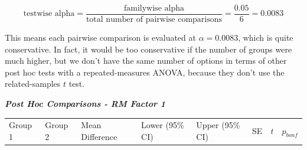 \documentclass[
  letterpaper,
  DIV=11,
  numbers=noendperiod]{scrreprt}
\begin{document}
\[
\text{testwise alpha} = \frac{\text{familywise alpha}}{\text{total number of pairwise comparisons}} = \frac{0.05}{6} = 0.0083
\]

This means each pairwise comparison is evaluated at \(\alpha = 0.0083\),
which is quite conservative. In fact, it would be too conservative if
the number of groups were much higher, but we don't have the same number
of options in terms of other post hoc tests with a repeated-measures
ANOVA, because they don't use the related-samples \(t\) test.

\textbf{\emph{Post Hoc Comparisons - RM Factor 1}}

\begin{longtable}[]{@{}
  >{\raggedright\arraybackslash}p{}
  >{\raggedright\arraybackslash}p{}
  >{\raggedright\arraybackslash}p{}
  >{\raggedright\arraybackslash}p{}
  >{\raggedright\arraybackslash}p{}
  >{\raggedright\arraybackslash}p{}
  >{\raggedright\arraybackslash}p{}
  >{\raggedright\arraybackslash}p{}@{}}
\toprule\noalign{}
\begin{minipage}[b]{\linewidth}\raggedright
Group 1
\end{minipage} & \begin{minipage}[b]{\linewidth}\raggedright
Group 2
\end{minipage} & \begin{minipage}[b]{\linewidth}\raggedright
Mean Difference
\end{minipage} & \begin{minipage}[b]{\linewidth}\raggedright
Lower (95\% CI)
\end{minipage} & \begin{minipage}[b]{\linewidth}\raggedright
Upper (95\% CI)
\end{minipage} & \begin{minipage}[b]{\linewidth}\raggedright
SE
\end{minipage} & \begin{minipage}[b]{\linewidth}\raggedright
\(t\)
\end{minipage} & \begin{minipage}[b]{\linewidth}\raggedright
\(p_{bonf}\)
\end{minipage} \\

\end{longtable}
\end{document}
